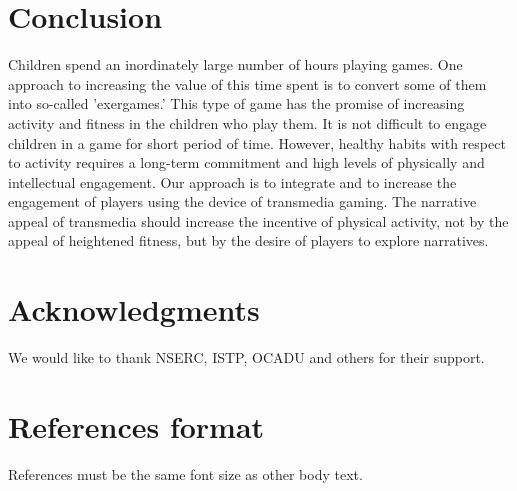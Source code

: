 \documentclass{SIGCHI2015LaTex/sigchi}
\begin{document}
\section{Conclusion}
Children spend an inordinately large number of hours playing games. One approach to increasing the value of this time spent is to convert some of them into so-called 'exergames.' This type of game has the promise of increasing activity and fitness in the children who play them. It is not difficult to engage children in a game for short period of time. However, healthy habits with respect to activity requires a long-term commitment and high levels of physically and intellectual engagement. Our approach is to integrate and to increase the engagement of players using the device of transmedia gaming. The narrative appeal of transmedia should increase the incentive of physical activity, not by the appeal of heightened fitness, but by the desire of players to explore narratives. 

\section{Acknowledgments}

We would like to thank NSERC, ISTP, OCADU and others for their support.

%
%
%
%
%
\balance

\section{References format}
References must be the same font size as other body text.



\end{document}
